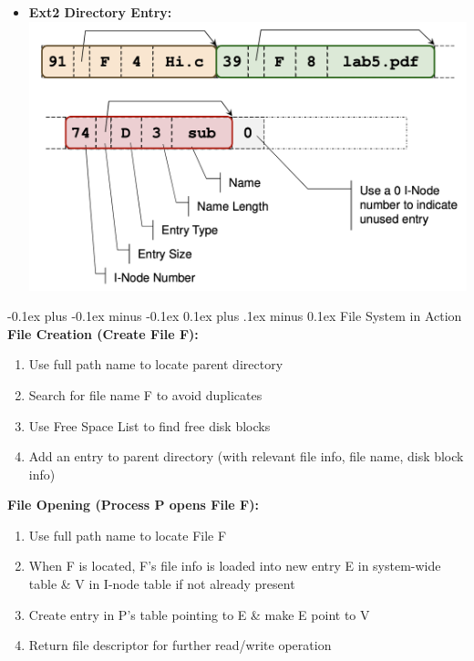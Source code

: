 \documentclass[landscape]{article}
\makeatletter
\renewcommand{\subsection}{\@startsection{subsection}{2}{0mm}%
  {-0.1ex plus -0.1ex minus -0.1ex}%
  {0.1ex plus .1ex minus 0.1ex}%
{\normalfont\scriptsize\bfseries}}
\makeatother
\begin{document}
\begin{multicols*}{6}
\begin{itemize}
      \item \textbf{Ext2 Directory Entry:}
      \includegraphics[width=0.75\linewidth]{24_ext2_dir_entry.png}
    \end{itemize}

    \subsection{File System in Action}
    \textbf{File Creation (Create File F):}
    \begin{enumerate}
      \item Use full path name to locate parent directory
      \item Search for file name F to avoid duplicates
      \item Use Free Space List to find free disk blocks
      \item Add an entry to parent directory (with relevant file info, file name, disk block info)
    \end{enumerate}
    \textbf{File Opening (Process P opens File F):}
    \begin{enumerate}
      \item Use full path name to locate File F
      \item When F is located, F's file info is loaded into new entry E in system-wide table \& V in I-node table if not already present
      \item Create entry in P's table pointing to E \& make E point to V
      \item Return file descriptor for further read/write operation
    \end{enumerate}
  \end{multicols*}
\end{document}
